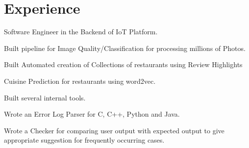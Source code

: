 \documentclass[]{deedy-resume-openfont}
\begin{document}
\begin{minipage}[t]{0.66\textwidth} 


\section{Experience}

\vspace{\topsep} %
\begin{tightemize}

\item Software Engineer in the Backend of IoT Platform.
\end{tightemize}
\sectionsep

\vspace{\topsep} %
\begin{tightemize}
\item Built pipeline for Image Quality/Classification for processing millions of Photos.
\item Built Automated creation of Collections of restaurants using Review Highlights
\item Cuisine Prediction for restaurants using word2vec.
\item Built several internal tools.
\end{tightemize}
\sectionsep


\vspace{\topsep} %
\begin{tightemize}
\item Wrote an Error Log Parser for C, C++, Python and Java.
\item Wrote a Checker for comparing user output with expected output to give appropriate suggestion for frequently occurring cases. 
\end{tightemize}
\sectionsep


\end{minipage}
\end{document}
